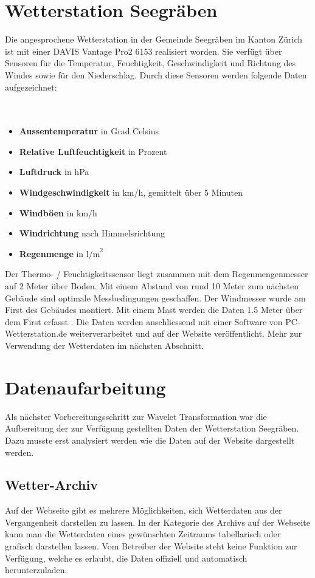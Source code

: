 \begin{refsection}
\section{Wetterstation Seegräben}

Die angesprochene Wetterstation in der Gemeinde Seegräben im Kanton Zürich ist mit einer DAVIS Vantage Pro2 6153 \cite{online:davisinstruments} realisiert worden.
Sie verfügt über Sensoren für die Temperatur, Feuchtigkeit, Geschwindigkeit und Richtung des Windes sowie für den Niederschlag. 
Durch diese Sensoren werden folgende Daten aufgezeichnet:
\\
\\
\\


\begin{itemize}
	\item \textbf{Aussentemperatur} in Grad Celsius
	\item \textbf{Relative Luftfeuchtigkeit} in Prozent
	\item \textbf{Luftdruck} in hPa
	\item \textbf{Windgeschwindigkeit} in km/h, gemittelt über 5 Minuten
	\item \textbf{Windböen} in km/h
	\item \textbf{Windrichtung} nach Himmelsrichtung
	\item \textbf{Regenmenge} in $\text{l/m}^{2}$
\end{itemize}	


Der Thermo- / Feuchtigkeitssensor liegt zusammen mit dem Regenmengenmesser auf 2 Meter über Boden.
Mit einem Abstand von rund 10 Meter zum nächsten Gebäude sind optimale Messbedingungen geschaffen.
Der Windmesser wurde am First des Gebäudes montiert.
Mit einem Mast werden die Daten 1.5 Meter über dem First erfasst \space \cite{online:wss}.
Die Daten werden anschliessend mit einer Software von PC-Wetterstation.de weiterverarbeitet und auf der Website veröffentlicht.
Mehr zur Verwendung der Wetterdaten im n\"achsten Abschnitt.

\section{Datenaufarbeitung}
Als n\"achster Vorbereitungsschritt zur Wavelet Transformation war die Aufbereitung der zur Verf\"ugung gestellten Daten der Wetterstation Seegr\"aben. Dazu musste erst analysiert werden wie die Daten auf der Website dargestellt werden.
\subsection{Wetter-Archiv}
Auf der Webseite gibt es mehrere Möglichkeiten, sich Wetterdaten aus der Vergangenheit darstellen zu lassen.
In der Kategorie des Archivs auf der Webseite kann man die Wetterdaten eines gew\"unschten Zeitraums tabellarisch oder grafisch darstellen lassen.
Vom Betreiber der Website steht keine Funktion zur Verfügung, welche es erlaubt, die Daten offiziell und automatisch herunterzuladen.

\end{refsection}
